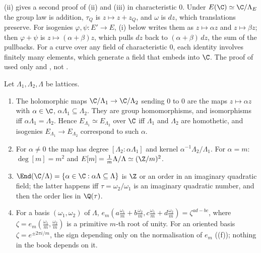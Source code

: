 \begin{remark}\label{rem:ellcurves:invdiff-C}
(ii) gives a second proof of (ii) and (iii) in characteristic $0$. Under $E(\C)\simeq\C/\Lambda_E$ the group law
is addition, $\tau_Q$ is $z\mapsto z+z_Q$, and $\omega$ is $dz$, which translations preserve. For isogenies $\varphi,\psi\colon E'\to E$, (i) below
writes them as $z\mapsto\alpha z$ and $z\mapsto\beta z$; then $\varphi+\psi$ is $z\mapsto(\alpha+\beta)z$, which pulls $dz$ back to $(\alpha+\beta)\,dz$, the sum of the
pullbacks. For a curve over any field of characteristic $0$, each identity involves finitely many elements, which generate a field that embeds into $\C$. The proof of  used only  and , not .
\end{remark}

\begin{proposition}\label{prop:ellcurves:cplxisog}
Let $\Lambda_1,\Lambda_2,\Lambda$ be lattices.
\begin{enumerate}[label=(\roman*)]
\item The holomorphic maps $\C/\Lambda_1\to\C/\Lambda_2$ sending $0$ to $0$ are the maps $z\mapsto\alpha z$ with $\alpha\in\C$, $\alpha\Lambda_1\subseteq\Lambda_2$. They are group homomorphisms, and
isomorphisms iff $\alpha\Lambda_1=\Lambda_2$. Hence $E_{\Lambda_1}\simeq E_{\Lambda_2}$ over $\C$ iff $\Lambda_1$ and $\Lambda_2$ are homothetic, and isogenies $E_{\Lambda_1}\to E_{\Lambda_2}$ correspond to such
$\alpha$.
\item For $\alpha\ne0$ the map has degree $[\Lambda_2:\alpha\Lambda_1]$ and kernel $\alpha^{-1}\Lambda_2/\Lambda_1$. For $\alpha=m$: $\deg[m]=m^2$ and $E[m]=\frac1m\Lambda/\Lambda\simeq(\Z/m)^2$.
\item $\End(\C/\Lambda)=\{\alpha\in\C:\alpha\Lambda\subseteq\Lambda\}$ is $\Z$ or an order in an imaginary quadratic field; the latter happens iff $\tau=\omega_2/\omega_1$ is an imaginary
quadratic number, and then the order lies in $\Q(\tau)$.
\item For a basis $(\omega_1,\omega_2)$ of $\Lambda$, $e_m(a\frac{\omega_1}m+b\frac{\omega_2}m,c\frac{\omega_1}m+d\frac{\omega_2}m)=\zeta^{ad-bc}$, where $\zeta=e_m(\frac{\omega_1}m,\frac{\omega_2}m)$ is a primitive
$m$-th root of unity. For an oriented basis $\zeta=e^{\pm2\pi i/m}$, the sign depending only on the normalisation of $e_m$ ((f)); nothing in the
book depends on it.
\end{enumerate}
\end{proposition}


